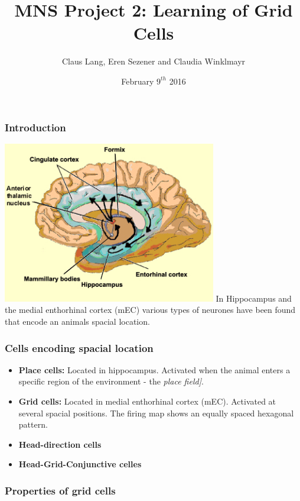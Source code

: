 \documentclass[mathserif]{beamer}
\title[MNS Project 2]{MNS Project 2: Learning of Grid Cells}
\author[C. Lang, E. Sezener, C.Winklmayr]{Claus Lang, Eren Sezener and Claudia Winklmayr}
\institute{BCCN}
\date[9.2.2016]{February $9^{th}$ 2016}
\begin{document}
\maketitle
%
%
\begin{frame}
\frametitle{Introduction}
\includegraphics[width=0.7\textwidth]{mEC.jpg}\newline
In Hippocampus and the medial enthorhinal cortex (mEC) various types of neurones have been found that encode an animals spacial location.  
\end{frame}
% 
%
%
\begin{frame}
\frametitle{Cells encoding spacial location}
\begin{itemize}
\item \textbf{Place cells:} Located in hippocampus. Activated when the animal enters a specific region of the environment - the \textit{place field]}. \newline
\item \textbf{Grid cells:} Located in  medial enthorhinal cortex (mEC). Activated at several spacial positions. The firing map shows an equally spaced hexagonal pattern. \newline
\item \textbf{Head-direction cells}\newline
\item \textbf{Head-Grid-Conjunctive celles}
\end{itemize}
\end{frame}
%
%
%
\begin{frame}
\frametitle{Properties of grid cells}
\end{frame}
%
%

\end{document}
